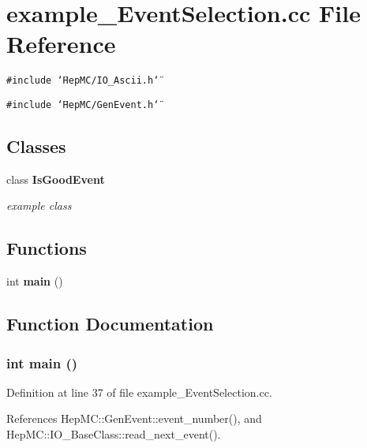 \section{example\_\-Event\-Selection.cc File Reference}
\label{example__EventSelection_8cc}
{\tt \#include \char`\"{}Hep\-MC/IO\_\-Ascii.h\char`\"{}}\par
{\tt \#include \char`\"{}Hep\-MC/Gen\-Event.h\char`\"{}}\par
\subsection*{Classes}
\begin{CompactItemize}
\item 
class {\bf Is\-Good\-Event}
\begin{CompactList}\small\item\em example class \item\end{CompactList}\end{CompactItemize}
\subsection*{Functions}
\begin{CompactItemize}
\item 
int {\bf main} ()
\end{CompactItemize}


\subsection{Function Documentation}
\subsubsection{\setlength{\rightskip}{0pt plus 5cm}int main ()}\label{example__EventSelection_8cc_e66f6b31b5ad750f1fe042a706a4e3d4}




Definition at line 37 of file example\_\-Event\-Selection.cc.

References Hep\-MC::Gen\-Event::event\_\-number(), and Hep\-MC::IO\_\-Base\-Class::read\_\-next\_\-event().